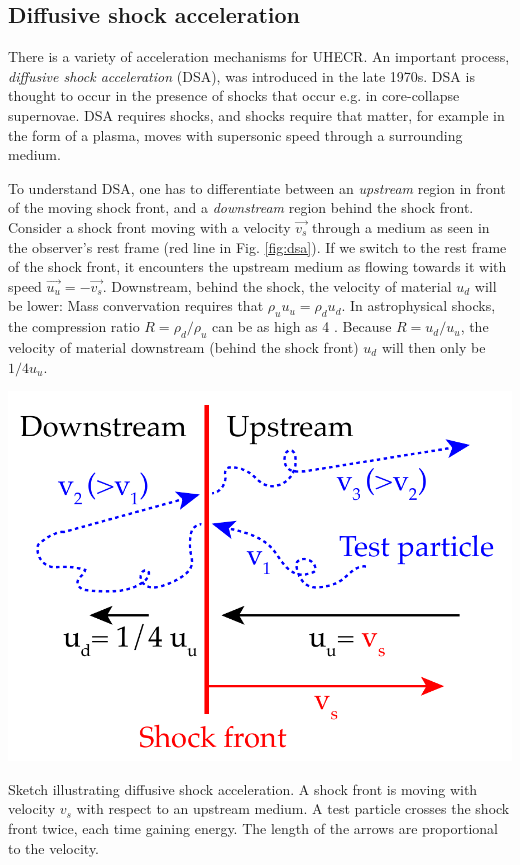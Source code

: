 \documentclass[
    a4paper, %
    fontsize=10pt, %
    twoside=false, %
    numbers=noenddot, %
    fontmethod=tex,
]{kaobook}
\begin{document}
\subsection{Diffusive shock acceleration} \label{dsa}
There is a variety of acceleration mechanisms for UHECR. An important process, \textit{diffusive shock acceleration} (DSA), was introduced in the late 1970s. DSA is thought to occur in the presence of shocks that occur e.g. in core-collapse supernovae. DSA requires shocks, and shocks require that matter, for example in the form of a plasma, moves with supersonic speed through a surrounding medium.

To understand DSA, one has to differentiate between an \textit{upstream} region in front of the moving shock front, and a \textit{downstream} region behind the shock front. Consider a shock front moving with a velocity $\vec{v_s}$ through a medium as seen in the observer's rest frame (red line in Fig. \ref{fig:dsa}). If we switch to the rest frame of the shock front, it encounters the upstream medium as flowing towards it with speed $\vec{u_u}=-\vec{v_s}$. Downstream, behind the shock, the velocity of material $u_d$ will be lower: Mass convervation requires that $\rho_u u_u = \rho_d u_d$. In astrophysical shocks, the compression ratio $R=\rho_d/\rho_u$ can be as high as 4 . Because $R=u_d/u_u$, the velocity of material downstream (behind the shock front) $u_d$ will then only be $1/4 u_u$.

\begin{marginfigure}
    \includegraphics{theory/dsa.pdf}
    \caption[Diffusive shock acceleration]{Sketch illustrating diffusive shock acceleration. A shock front is moving with velocity $v_s$ with respect to an upstream medium. A test particle crosses the shock front twice, each time gaining energy. The length of the arrows are proportional to the velocity.}
\end{marginfigure}
\end{document}
